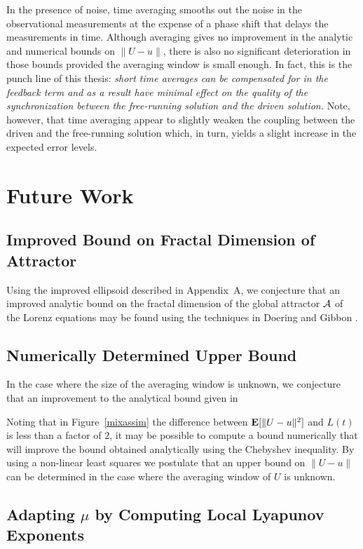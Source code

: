 \documentclass[master,tocprelim,12pt]{unrthesis}
\theoremstyle{definition}
\numberwithin{equation}{chapter}
\begin{document}
\begin{manuscript}
In the presence of noise, time averaging smooths out the noise
in the observational measurements at the expense of a phase
shift that delays the measurements in time.
Although averaging gives no improvement in the analytic and numerical
bounds on $\|U-u\|$, there is also no significant deterioration 
in those bounds provided the averaging window is small enough.
In fact, this is the punch line of this thesis:  {\it short time
averages can be compensated for in the feedback term and as a
result have minimal effect on the quality of the synchronization 
between the free-running solution and the driven solution.}
Note, however, that time averaging appear to slightly weaken the
coupling between the driven and the free-running solution
which, in turn, yields a slight increase in the expected error levels.

\chapter{Future Work}

\section{Improved Bound on Fractal Dimension of Attractor}
	\label{fractalbound}
Using the improved ellipsoid described in Appendix~A, we conjecture that
an improved analytic bound on the fractal dimension of the global
attractor ${\cal A}$ of the Lorenz equations may be found using the
techniques in Doering and Gibbon \cite{Doering95a}.

\section{Numerically Determined Upper Bound}

In the case where the size of the averaging window is unknown, we conjecture
that an improvement to the analytical bound given in 

Noting that in Figure~\ref{mixassim} the difference between ${\bf E}[\| U - u\|^2]$ and $L(t)$ is less than a factor of $2$, it may be possible to compute a bound numerically that will improve the bound obtained analytically using the Chebyshev inequality.
By using a non-linear least squares we postulate that an upper bound on $\| U - u\|$ can be determined in the case where the averaging window of $U$ is unknown.

\section{Adapting $\mu$ by Computing Local Lyapunov Exponents}


\end{manuscript}
\end{document}
